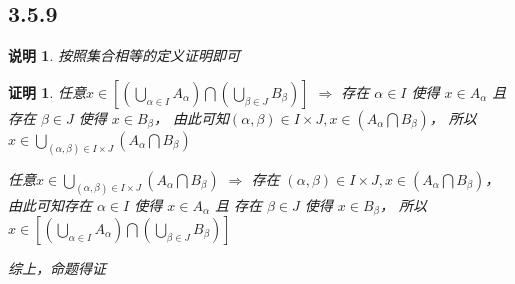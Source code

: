 \documentclass{article}
\theoremstyle{mystyle}
\newtheorem*{zremark}{说明}
\theoremstyle{zproofstyle}
\newtheorem*{zproof}{证明}
\begin{document}
\subsection*{3.5.9}
\begin{zgraytheorem}
  \begin{zremark}
    按照集合相等的定义证明即可
  \end{zremark}
\end{zgraytheorem}
\begin{zproof}
  任意$x \in [(\bigcup \limits_{\alpha \in I}A_\alpha) \bigcap (\bigcup \limits_{\beta \in J}B_\beta)]$
  $\Rightarrow$ 存在 $\alpha \in I$ 使得 $x \in A_\alpha$ 且 存在 $\beta \in J$ 使得 $x \in B_\beta$，
  由此可知$(\alpha,\beta) \in I \times J, x \in (A_\alpha \bigcap B_\beta)$，
  所以$x \in \bigcup \limits_{(\alpha,\beta) \in I \times J}(A_\alpha \bigcap B_\beta)$

  任意$x \in \bigcup \limits_{(\alpha,\beta) \in I \times J}(A_\alpha \bigcap B_\beta)$
  $\Rightarrow$ 存在 $(\alpha,\beta) \in I \times J, x \in (A_\alpha \bigcap B_\beta)$，
  由此可知存在 $\alpha \in I$ 使得 $x \in A_\alpha$ 且 存在 $\beta \in J$ 使得 $x \in B_\beta$，
  所以$x \in [(\bigcup \limits_{\alpha \in I}A_\alpha) \bigcap (\bigcup \limits_{\beta \in J}B_\beta)]$

  综上，命题得证
\end{zproof}
\end{document}
